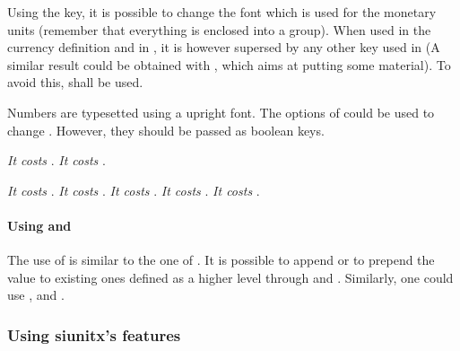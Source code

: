\documentclass[12pt,add-index]{cnltx-doc}
\begin{document}
Using the  key, it is possible to change the font which 
is used for the monetary units (remember that everything is enclosed into a group). 
When used in the currency definition and in , 
it is however supersed by any other  key used in 
(A similar result could be obtained with , which aims
at putting some material). To avoid this,  shall be used.

Numbers are typesetted using a upright font. The 
options of  could be used to change \cite[\S~5.2]{siunitx}.
However, they should be passed as boolean keys. 


\begin{example}
    \textit{It costs }.
    \textit{It costs }.
    \begin{empty}
    \textit{It costs }.
    \textit{It costs }.
    \textit{It costs }.
    \textit{It costs }.
    \textit{It costs }.
    \end{empty}
\end{example}

\paragraph*{Using  and }

The use of  is similar to the one of .
It is possible to append or to prepend the value to existing ones
defined as a higher level through  and .
Similarly, one could use ,  and .

\begin{example}
\end{example}

\subsubsection{Using siunitx's features}
\end{document}
